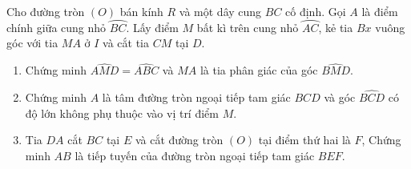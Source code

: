 \begin{bt}%
	Cho đường tròn $(O)$ bán kính $R$ và một dây cung $BC$ cố định. Gọi $A$ là điểm chính giữa cung nhỏ $\wideparen{BC}$. Lấy điểm $M$ bất kì trên cung nhỏ $\wideparen{AC}$, kẻ tia $Bx$ vuông góc với tia $MA$ ở $I$ và cắt tia $CM$ tại $D$.
	\begin{enumerate}
		\item Chứng minh $\widehat{AMD}=\widehat{ABC}$ và $MA$ là tia phân giác của góc $\widehat{BMD}$.
		\item Chứng minh $A$ là tâm đường tròn ngoại tiếp tam giác $BCD$ và góc $\widehat{BCD}$ có độ lớn không phụ thuộc vào vị trí điểm $M$.
		\item Tia $DA$ cắt $BC$ tại $E$ và cắt đường tròn $(O)$ tại điểm thứ hai là $F$, Chứng minh $AB$ là tiếp tuyến của đường tròn ngoại tiếp tam giác $BEF$.
	\end{enumerate}
\end{bt}
